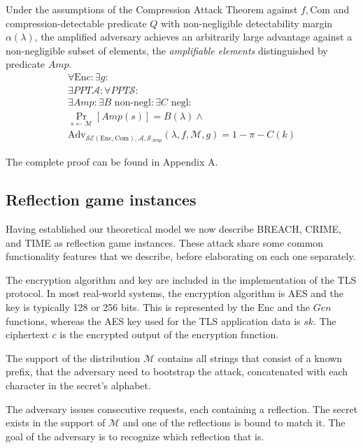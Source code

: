 \begin{lemma}[Amplification]

Under the assumptions of the Compression Attack Theorem against $f, \textrm{Com}$
and compression-detectable predicate $Q$ with non-negligible
detectability margin $\alpha(\lambda)$,
the amplified adversary achieves an arbitrarily large advantage
against a non-negligible subset of elements, the
\textit{amplifiable elements} distinguished by predicate $Amp$.
\begin{align*}
    \forall \textrm{Enc}:
    \exists g:\\
    \exists PPT \mathcal{A}:
    \forall PPT \mathcal{S}:\\
    \exists Amp:
    \exists B \text{ non-negl}:
    \exists C \text{ negl}:\\
    \Pr_{s \leftarrow \mathcal{M}}[Amp(s)] = B(\lambda) \land\\
    \text{Adv}_{\mathcal{SE}(\textrm{Enc}, \textrm{Com}), \mathcal{A}, \mathcal{S}_{Amp}}
    (\lambda, f, \mathcal{M}, g) = 1 - \pi - C(k)
\end{align*}

\end{lemma}

The complete proof can be found in Appendix A.

\subsection{Reflection game instances}
Having established our theoretical model we now describe BREACH, CRIME, and TIME
as reflection game instances. These attack share some common functionality
features that we describe, before elaborating on each one separately.

The encryption algorithm and key are included in the implementation of the TLS
protocol. In most real-world systems, the encryption algorithm is AES and the
key is typically 128 or 256 bits. This is represented by the $\textrm{Enc}$ and
the $Gen$ functions, whereas the AES key used for the TLS application data is
$sk$. The ciphertext $c$ is the encrypted output of the encryption function.

The support of the distribution $\mathcal{M}$ contains all strings that consist
of a known prefix, that the adversary need to bootstrap the attack, concatenated
with each character in the secret's alphabet.

The adversary issues consecutive requests, each containing a reflection. The
secret exists in the support of $\mathcal{M}$ and one of the reflections is
bound to match it. The goal of the adversary is to recognize which reflection
that is.

